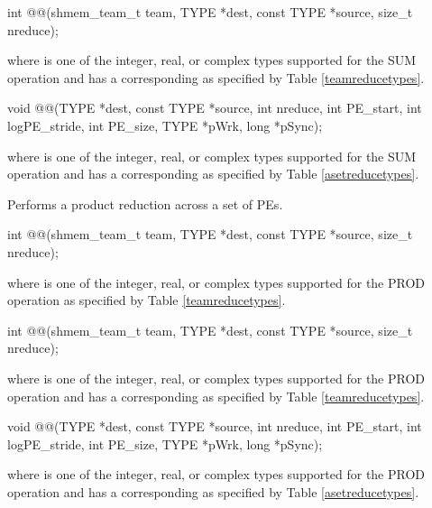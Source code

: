\begin{apidefinition}
\begin{CsynopsisCol}
int @@(shmem_team_t team, TYPE *dest, const TYPE *source, size_t nreduce);
\end{CsynopsisCol}
where \TYPE{} is one of the integer, real, or complex types supported for the SUM operation and has a corresponding \TYPENAME{} as specified by Table \ref{teamreducetypes}.

\begin{DeprecateBlock}
\begin{CsynopsisCol}
void @@(TYPE *dest, const TYPE *source, int nreduce, int PE_start, int logPE_stride, int PE_size, TYPE *pWrk, long *pSync);
\end{CsynopsisCol}
\end{DeprecateBlock}
where \TYPE{} is one of the integer, real, or complex types supported for the SUM operation and has a corresponding \TYPENAME{} as specified by Table \ref{asetreducetypes}.

\label{subsec:shmem_prod_reduce}
Performs a product reduction across a set of \acp{PE}.\newline

\begin{C11synopsis}
int @@(shmem_team_t team, TYPE *dest, const TYPE *source, size_t nreduce);
\end{C11synopsis}
where \TYPE{} is one of the integer, real, or complex types supported for the PROD operation as specified by Table \ref{teamreducetypes}.

\begin{Csynopsis}
\end{Csynopsis}

\begin{CsynopsisCol}
int @@(shmem_team_t team, TYPE *dest, const TYPE *source, size_t nreduce);
\end{CsynopsisCol}
where \TYPE{} is one of the integer, real, or complex types supported for the PROD operation and has a corresponding \TYPENAME{} as specified by Table \ref{teamreducetypes}.

\begin{DeprecateBlock}
\begin{CsynopsisCol}
void @@(TYPE *dest, const TYPE *source, int nreduce, int PE_start, int logPE_stride, int PE_size, TYPE *pWrk, long *pSync);
\end{CsynopsisCol}
\end{DeprecateBlock}
where \TYPE{} is one of the integer, real, or complex types supported for the PROD operation and has a corresponding \TYPENAME{} as specified by Table \ref{asetreducetypes}.


\end{apidefinition}
